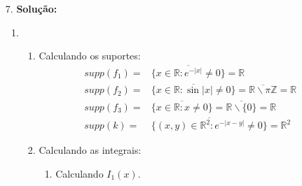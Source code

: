 \documentclass{article}
\begin{document}
\begin{enumerate}
		\item[7.] \textbf{Solução:} 
			\begin{enumerate}
				\item 
				\begin{enumerate}
					\item Calculando os suportes:
					$$
					\begin{aligned}
					supp(f_{1}) = & \overline{ \{x \in \mathbb{R}: e^{-|x|} \neq 0\} } = \mathbb{R} \\ 
					supp(f_{2}) = & \overline{ \{x \in \mathbb{R}: \sin{|x|} \neq 0\} } = \overline{\mathbb{R} \backslash \pi \mathbb{Z} } = \mathbb{R}\\ 
					supp(f_{3}) = & \overline{ \{x \in \mathbb{R}: x \neq 0\} } = \overline{ \mathbb{R}\backslash \{0\} } = \mathbb{R} \\
					supp(k) = & \overline{ \{(x,y) \in \mathbb{R}^{2}: e^{-|x-y|} \neq 0\} } = \mathbb{R}^{2}
					\end{aligned}
					$$
					
					\item Calculando as integrais:
					\begin{enumerate}
						\item Calculando $I_{1}(x).$ 
						

\end{enumerate}
\end{enumerate}
\end{enumerate}
\end{enumerate}
\end{document}
